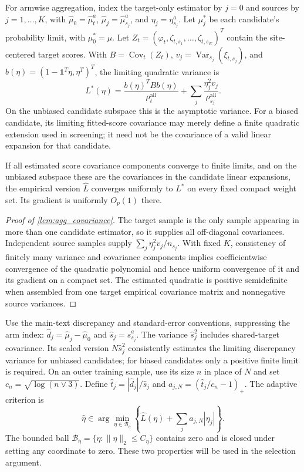 \documentclass[12pt]{article}
\begin{document}
For armwise aggregation, index the target-only estimator by $j=0$ and sources by $j=1,\ldots,K$, with $\widehat\mu_0=\widehat\mu_t^a$, $\widehat\mu_j=\widehat\mu_{s_j}^a$, and $\eta_j=\eta_{s_j}^a$. Let $\mu_j^*$ be each candidate's probability limit, with $\mu_0^*=\mu$. Let $Z_t=(\varphi_t,\zeta_{t,s_1},\ldots,\zeta_{t,s_K})^T$ contain the site-centered target scores. With $B=\operatorname{Cov}_t(Z_t)$, $v_j=\operatorname{Var}_{s_j}(\xi_{t,s_j})$, and $b(\eta)=(1-\boldsymbol1^T\eta,\eta^T)^T$, the limiting quadratic variance is
\[
L^*(\eta)=\frac{b(\eta)^TBb(\eta)}{\rho_t^{\mathrm{all}}}
+\sum_j\frac{\eta_j^2v_j}{\rho_{s_j}^{\mathrm{all}}}.
\]
On the unbiased candidate subspace this is the asymptotic variance. For a biased candidate, its limiting fitted-score covariance may merely define a finite quadratic extension used in screening; it need not be the covariance of a valid linear expansion for that candidate.

\begin{lemma}\label{lem:agg_covariance}
If all estimated score covariance components converge to finite limits, and on the unbiased subspace these are the covariances in the candidate linear expansions, the empirical version $\widehat L$ converges uniformly to $L^*$ on every fixed compact weight set. Its gradient is uniformly $O_p(1)$ there.
\end{lemma}
\begin{proof}[Proof of \cref{lem:agg_covariance}]
The target sample is the only sample appearing in more than one candidate estimator, so it supplies all off-diagonal covariances. Independent source samples supply $\sum_j\eta_j^2v_j/n_{s_j}$. With fixed $K$, consistency of finitely many variance and covariance components implies coefficientwise convergence of the quadratic polynomial and hence uniform convergence of it and its gradient on a compact set. The estimated quadratic is positive semidefinite when assembled from one target empirical covariance matrix and nonnegative source variances.
\end{proof}

Use the main-text discrepancy and standard-error conventions, suppressing the arm index: $\widehat d_j=\widehat\mu_j-\widehat\mu_0$ and $\widehat s_j=\widehat s_{s_j}^a$. The variance $\widehat s_j^2$ includes shared-target covariance. Its scaled version $N\widehat s_j^2$ consistently estimates the limiting discrepancy variance for unbiased candidates; for biased candidates only a positive finite limit is required. On an outer training sample, use its size $n$ in place of $N$ and set $c_n=\sqrt{\log(n\vee3)}$. Define $\widehat t_j=|\widehat d_j|/\widehat s_j$ and $a_{j,N}=(\widehat t_j/c_n-1)_+$. The adaptive criterion is
\[
\widehat\eta\in\arg\min_{\eta\in\mathcal B_\eta}
\left\{\widehat L(\eta)+\sum_j a_{j,N}|\eta_j|\right\}.
\]
The bounded ball $\mathcal B_\eta=\{\eta:\|\eta\|_2\le C_\eta\}$ contains zero and is closed under setting any coordinate to zero. These two properties will be used in the selection argument.
\end{document}
